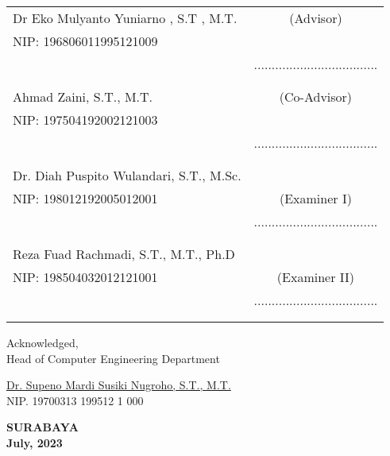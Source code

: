     \noindent
    \begin{tabularx}{\textwidth}{X c}                        
      Dr Eko Mulyanto Yuniarno , S.T , M.T.       & (Advisor) \\
      NIP: 196806011995121009      & \\
      & ................................... \\
      &  \\
      &  \\
      Ahmad Zaini, S.T., M.T.     & (Co-Advisor) \\
      NIP: 197504192002121003        & \\
      & ................................... \\
      &  \\
      &  \\
      Dr. Diah Puspito Wulandari, S.T., M.Sc.    &                 \\
      NIP: 198012192005012001   & (Examiner I)    \\
      & ................................... \\
      &  \\
      &  \\            
      Reza Fuad Rachmadi, S.T., M.T., Ph.D &                 \\
      NIP: 198504032012121001   & (Examiner II) \\
      & ................................... \\
      &  \\
      &  \\   
    \end{tabularx}
  \endgroup

  \begin{center}
    Acknowledged, \\
    Head of Computer Engineering Department\\

    \vspace{8ex}

    \underline{Dr. Supeno Mardi Susiki Nugroho, S.T., M.T.} \\
    NIP. 19700313 199512 1 000
  \end{center}

  \begin{center}
    \textbf{SURABAYA\\July, 2023}
  \end{center}
\endgroup